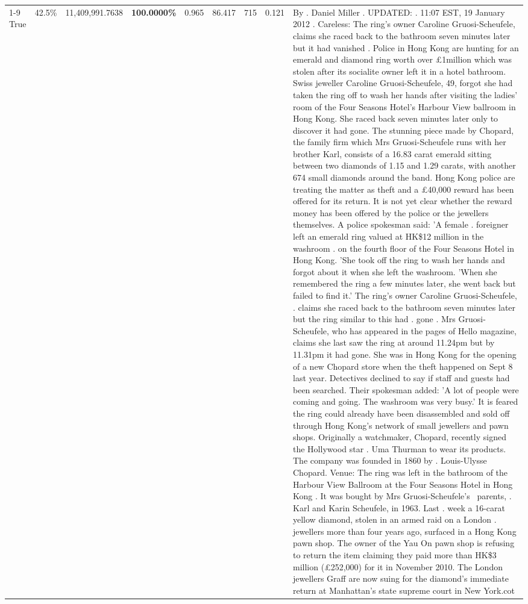 \begin{table}[H]
\begin{tabular}{lllrlllll}
\cline{1-9} \cline{2-9}
True & 42.5\% & 11,409,991.7638 & \bfseries \color{red} 100.0000\% & 0.965 & 86.417 & 715 & 0.121 & By . Daniel Miller . UPDATED: . 11:07 EST, 19 January 2012 . Careless: The ring's owner Caroline Gruosi-Scheufele, claims she raced back to the bathroom seven minutes later but it had vanished . Police in Hong Kong are hunting for an emerald and diamond ring worth over £1million which was stolen after its socialite owner left it in a hotel bathroom. Swiss jeweller Caroline Gruosi-Scheufele, 49, forgot she had taken the ring off to wash her hands after visiting the ladies' room of the Four Seasons Hotel's Harbour View ballroom in Hong Kong. She raced back seven minutes later only to discover it had gone. The stunning piece made by Chopard, the family firm which Mrs Gruosi-Scheufele runs with her brother Karl, consists of a 16.83 carat emerald sitting between two diamonds of 1.15 and 1.29 carats, with another 674 small diamonds around the band. Hong Kong police are treating the matter as theft and a £40,000 reward has been offered for its return. It is not yet clear whether the reward money has been offered by the police or the jewellers themselves. A police spokesman said: 'A female . foreigner left an emerald ring valued at HK\$12 million in the washroom . on the fourth floor of the Four Seasons Hotel in Hong Kong. 'She took off the ring to wash her hands and forgot about it when she left the washroom. 'When she remembered the ring a few minutes later, she went back but failed to find it.' The ring's owner Caroline Gruosi-Scheufele, . claims she raced back to the bathroom seven minutes later but the ring similar to this had . gone . Mrs Gruosi-Scheufele, who has appeared in the pages of Hello magazine, claims she last saw the ring at around 11.24pm but by 11.31pm it had gone. She was in Hong Kong for the opening of a new Chopard store when the theft happened on Sept 8 last year. Detectives declined to say if staff and guests had been searched. Their spokesman added: 'A lot of people were coming and going. The washroom was very busy.' It is feared the ring could already have been disassembled and sold off through Hong Kong's network of small jewellers and pawn shops. Originally a watchmaker, Chopard, recently signed the Hollywood star . Uma Thurman to wear its products. The company was founded in 1860 by . Louis-Ulysse Chopard. Venue: The ring was left in the bathroom of the Harbour View Ballroom at the Four Seasons Hotel in Hong Kong . It was bought by Mrs Gruosi-Scheufele's  parents, . Karl and Karin Scheufele, in 1963. Last . week a 16-carat yellow diamond, stolen in an armed raid on a London . jewellers more than four years ago, surfaced in a Hong Kong pawn shop. The owner of the Yau On pawn shop is refusing to return the item claiming they paid more than HK\$3 million (£252,000) for it in November 2010. The London jewellers Graff are now suing for the diamond’s immediate return at Manhattan’s state supreme court in New York.cot \\

\end{tabular}
\end{table}
